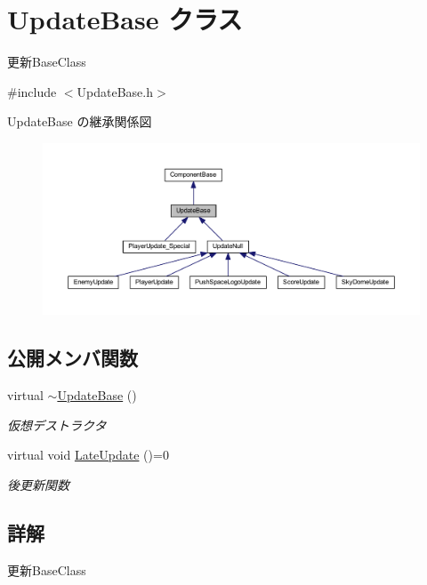\hypertarget{class_update_base}{}\section{Update\+Base クラス}
\label{class_update_base}


更新\+Base\+Class  




{\ttfamily \#include $<$Update\+Base.\+h$>$}



Update\+Base の継承関係図\nopagebreak
\begin{figure}[H]
\begin{center}
\leavevmode
\includegraphics[width=350pt]{class_update_base__inherit__graph}
\end{center}
\end{figure}
\subsection*{公開メンバ関数}
\begin{DoxyCompactItemize}
\item 
virtual \mbox{\hyperlink{class_update_base_aad4c3e15c4b67871a0fe13c9f85e5918}{$\sim$\+Update\+Base}} ()
\begin{DoxyCompactList}\small\item\em 仮想デストラクタ \end{DoxyCompactList}\item 
virtual void \mbox{\hyperlink{class_update_base_afc4956f78135aed5fc4e4f9991be50b9}{Late\+Update}} ()=0
\begin{DoxyCompactList}\small\item\em 後更新関数 \end{DoxyCompactList}\end{DoxyCompactItemize}


\subsection{詳解}
更新\+Base\+Class 

